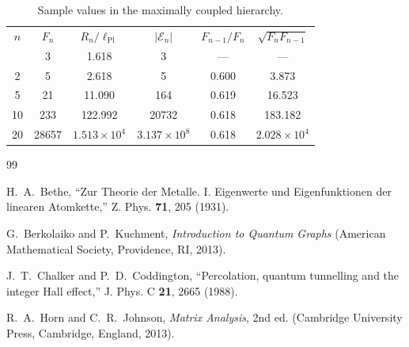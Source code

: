 \documentclass[
  aps,
  prd,
  reprint,
  superscriptaddress,
  nofootinbib,
  longbibliography,
  amsmath,
  amssymb
]{revtex4-2}
\theoremstyle{remark}
\newcommand{\lPl}{\ell_{\mathrm{Pl}}}
\begin{document}
\begin{table}[b]
\caption{Sample values in the maximally coupled hierarchy.}
\label{tab:values}
\begin{ruledtabular}
\begin{tabular}{cccccc}
$n$ & $F_n$ & $R_n/\lPl$ & $|\mathcal E_n|$ & $F_{n-1}/F_n$ & $\sqrt{F_nF_{n-1}}$ \\
\colrule
1 & 3 & 1.618 & 3 & --- & --- \\
2 & 5 & 2.618 & 5 & 0.600 & 3.873 \\
5 & 21 & 11.090 & 164 & 0.619 & 16.523 \\
10 & 233 & 122.992 & 20732 & 0.618 & 183.182 \\
20 & 28657 & $1.513\times 10^4$ & $3.137\times 10^8$ & 0.618 & $2.028\times 10^4$ \\
\end{tabular}
\end{ruledtabular}
\end{table}

\begin{thebibliography}{99}

H.~A.~Bethe,
``Zur Theorie der Metalle. I. Eigenwerte und Eigenfunktionen der linearen Atomkette,''
Z. Phys. \textbf{71}, 205 (1931).

G.~Berkolaiko and P.~Kuchment,
\emph{Introduction to Quantum Graphs}
(American Mathematical Society, Providence, RI, 2013).

J.~T.~Chalker and P.~D.~Coddington,
``Percolation, quantum tunnelling and the integer Hall effect,''
J. Phys. C \textbf{21}, 2665 (1988).

R.~A.~Horn and C.~R.~Johnson,
\emph{Matrix Analysis}, 2nd ed.
(Cambridge University Press, Cambridge, England, 2013).

\end{thebibliography}
\end{document}
